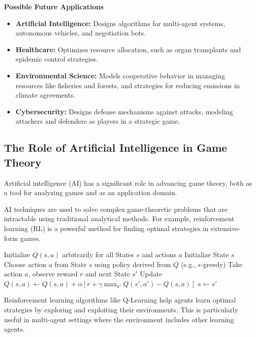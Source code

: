 \documentclass[12pt]{book} %
\begin{document}
\textbf{Possible Future Applications}
\begin{itemize}
    \item \textbf{Artificial Intelligence:} Designs algorithms for multi-agent systems, autonomous vehicles, and negotiation bots.
    \item \textbf{Healthcare:} Optimizes resource allocation, such as organ transplants and epidemic control strategies.
    \item \textbf{Environmental Science:} Models cooperative behavior in managing resources like fisheries and forests, and strategies for reducing emissions in climate agreements.
    \item \textbf{Cybersecurity:} Designs defense mechanisms against attacks, modeling attackers and defenders as players in a strategic game.
\end{itemize}


\subsection{The Role of Artificial Intelligence in Game Theory}
Artificial intelligence (AI) has a significant role in advancing game theory, both as a tool for analyzing games and as an application domain.

AI techniques are used to solve complex game-theoretic problems that are intractable using traditional analytical methods. For example, reinforcement learning (RL) is a powerful method for finding optimal strategies in extensive-form games.
\FloatBarrier
\begin{algorithm}
\caption{Q-Learning for Optimal Strategy}
\begin{algorithmic}[1]
\State Initialize $Q(s, a)$ arbitrarily for all States $s$ and actions $a$
\State Initialize State $s$
    \State Choose action $a$ from State $s$ using policy derived from $Q$ (e.g., $\epsilon$-greedy)
    \State Take action $a$, observe reward $r$ and next State $s'$
    \State Update $Q(s, a) \leftarrow Q(s, a) + \alpha [r + \gamma \max_{a'} Q(s', a') - Q(s, a)]$
    \State $s \leftarrow s'$
\EndWhile
\end{algorithmic}
\end{algorithm}
\FloatBarrier

Reinforcement learning algorithms like Q-Learning help agents learn optimal strategies by exploring and exploiting their environments. This is particularly useful in multi-agent settings where the environment includes other learning agents.
\end{document}
